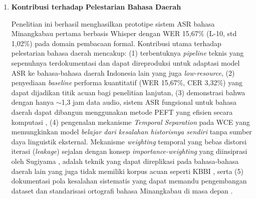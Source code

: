 \begin{enumerate}
\begin{enumerate}
        \item \textbf{Substitusi vokal}: Pengubahan bunyi vokal pada suku kata tertentu (contoh: \textit{elok} $\rightarrow$ \textit{elo}), bersifat ringan dengan kontribusi kecil pada CER.
    \end{enumerate}

    Dibandingkan dengan \textit{Freeze Encoder}, \textit{Fold}~4 dari LoRA L-9 berhasil memprediksi sempurna (WER 0\%, CER 0\%) sejumlah kalimat panjang yang kompleks, membuktikan efektivitas adaptasi LoRA di seluruh lapisan encoder dan decoder model.

    \item \textbf{Kontribusi terhadap Pelestarian Bahasa Daerah}

    Penelitian ini berhasil menghasilkan prototipe sistem ASR bahasa Minangkabau pertama berbasis Whisper dengan WER 15,67\% (L-10, std 1,02\%) pada domain pembacaan formal. Kontribusi utama terhadap pelestarian bahasa daerah mencakup: (1) terbentuknya \textit{pipeline} teknis yang sepenuhnya terdokumentasi dan dapat direproduksi untuk adaptasi model ASR ke bahasa-bahasa daerah Indonesia lain yang juga \textit{low-resource}, (2) penyediaan \textit{baseline} performa kuantitatif (WER 15,67\%, CER 3,32\%) yang dapat dijadikan titik acuan bagi penelitian lanjutan, (3) demonstrasi bahwa dengan hanya $\sim$1,3 jam data audio, sistem ASR fungsional untuk bahasa daerah dapat dibangun menggunakan metode PEFT yang efisien secara komputasi \cite{hu2022lora, gupta2024parameter}, (4) pengenalan mekanisme \textit{Temporal Separation} pada WCE yang memungkinkan model \textit{belajar dari kesalahan historisnya sendiri} tanpa sumber daya linguistik eksternal. Mekanisme \textit{weighting} temporal yang bebas distorsi iterasi (\textit{leakage}) sejalan dengan konsep \textit{importance-weighting} yang diinsiprasi oleh Sugiyama \cite{sugiyama2007covariate}, adalah teknik yang dapat direplikasi pada bahasa-bahasa daerah lain yang juga tidak memiliki korpus acuan seperti KBBI \cite{pineiromartin2024weighted}, serta (5) dokumentasi pola kesalahan sistematis yang dapat memandu pengembangan dataset dan standarisasi ortografi bahasa Minangkabau di masa depan \cite{koto2020minangkabau, sovia2022minangkabau}.

\end{enumerate}



